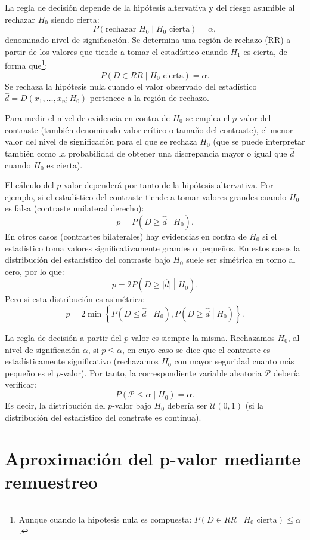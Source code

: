 \documentclass[
]{book}
\theoremstyle{break}
\theoremstyle{definition}
\theoremstyle{definition}
\theoremstyle{definition}
\theoremstyle{definition}
\theoremstyle{remark}
\begin{document}
La regla de decisión depende de la hipótesis altervativa y
del riesgo asumible al rechazar \(H_0\) siendo cierta:
\[P\left( \text{rechazar }H_0\mid H_0\text{ cierta}\right) =\alpha,\]
denominado nivel de significación.
Se determina una región de rechazo (RR) a partir de los valores que tiende
a tomar el estadístico cuando \(H_1\) es cierta,
de forma que\footnote{Aunque cuando la hipotesis nula es compuesta:
  \(P\left( D\in RR \mid H_0\text{ cierta}\right) \leq \alpha\).}:
\[P\left( D\in RR \mid H_0\text{ cierta}\right) =\alpha.\]
Se rechaza la hipótesis nula cuando el valor observado del
estadístico \(\hat{d}=D\left( x_1,\ldots ,x_n;H_0\right)\) pertenece
a la región de rechazo.

Para medir el nivel de evidencia en contra de \(H_0\) se emplea el
\(p\)-valor del contraste (también denominado valor crítico o
tamaño del contraste), el menor valor del nivel
de significación para el que se rechaza \(H_0\)
(que se puede interpretar también como la
probabilidad de obtener una discrepancia mayor o igual que
\(\hat{d}\) cuando \(H_0\) es cierta).

El cálculo del \(p\)-valor dependerá por tanto de la hipótesis altervativa.
Por ejemplo, si el estadístico del contraste tiende a tomar valores
grandes cuando \(H_0\) es falsa (contraste unilateral derecho):
\[p = P\left( D \geq \hat{d} \middle| H_0\right).\]
En otros casos (contrastes bilaterales) hay evidencias en contra de
\(H_0\) si el estadístico toma valores significativamente grandes o pequeños.
En estos casos la distribución del estadístico del contraste bajo \(H_0\)
suele ser simétrica en torno al cero, por lo que:
\[p = 2P\left( D \geq \vert \hat{d} \vert \middle| H_0 \right).\]
Pero si esta distribución es asimétrica:
\[p = 2 \min \left\{ P\left( D \leq \hat{d} \middle| H_0 \right),
P\left( D \geq \hat{d} \middle| H_0\right) \right\}.\]

La regla de decisión a partir del \(p\)-valor es siempre la misma.
Rechazamos \(H_0\), al nivel de significación \(\alpha\), si \(p \leq \alpha\),
en cuyo caso se dice que el contraste es estadísticamente significativo
(rechazamos \(H_0\) con mayor seguridad cuanto más pequeño es el \(p\)-valor).
Por tanto, la correspondiente variable aleatoria \(\mathcal{P}\) debería verificar:
\[P\left( \mathcal{P} \leq \alpha \middle| H_0\right)= \alpha.\]
Es decir, la distribución del \(p\)-valor bajo \(H_0\) debería ser \(\mathcal{U}(0,1)\)
(si la distribución del estadístico del constrate es continua).

\hypertarget{aproximaciuxf3n-del-p-valor-mediante-remuestreo}{%
\section{Aproximación del p-valor mediante remuestreo}\label{aproximaciuxf3n-del-p-valor-mediante-remuestreo}}
\end{document}
